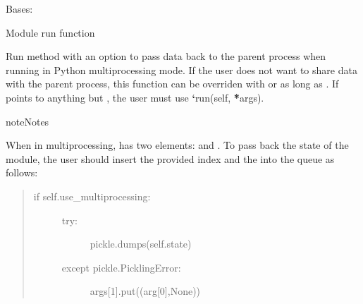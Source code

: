 \documentclass[letterpaper,10pt,openany,oneside,english]{sphinxmanual}
\begin{document}
\begin{fulllineitems}
\label{\detokenize{examples_rst/body:body.Body}}
Bases: 

\begin{fulllineitems}
\label{\detokenize{examples_rst/body:body.Body.acceleration}}
\end{fulllineitems}


\begin{fulllineitems}
\label{\detokenize{examples_rst/body:body.Body.run}}
Module run function

Run method with an option to pass data back to the parent process when running
in Python multiprocessing mode. If the user does not want to share data with
the parent process, this function can be overriden with 
or  as long as .
If  points to anything but , the user must use
{\color{red}\bfseries{}{}`}run(self, {\color{red}\bfseries{}*}args).

\begin{sphinxadmonition}{note}{Notes}

When in multiprocessing,  has two elements:  and .
To pass back the state of the module, the user should insert the provided
index  and the  into the queue as follows:
\begin{quote}
\begin{description}
\item[{if self.use\_multiprocessing:}] \leavevmode\begin{description}
\item[{try:}] \leavevmode
pickle.dumps(self.state)

\item[{except pickle.PicklingError:}] \leavevmode
args{[}1{]}.put((arg{[}0{]},None))


\end{description}
\end{description}
\end{quote}
\end{sphinxadmonition}
\end{fulllineitems}
\end{fulllineitems}
\end{document}
